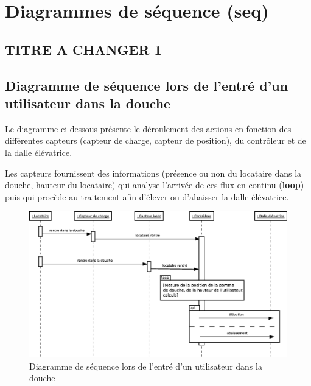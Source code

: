 \chapter{Diagrammes de séquence (seq)}
\section{TITRE A CHANGER 1}

\section{Diagramme de séquence lors de l'entré d'un utilisateur dans la douche}
Le diagramme ci-dessous présente le déroulement des actions en fonction des différentes capteurs (capteur de charge, capteur de position), du contrôleur et de la dalle élévatrice. 

Les capteurs fournissent des informations (présence ou non du locataire dans la douche, hauteur du locataire) qui analyse l'arrivée de ces flux en continu (\textbf{loop}) puis qui procède au traitement afin d'élever ou d'abaisser la dalle élévatrice. 
\begin{figure}[H]
	\centering
	\includegraphics[width=1\linewidth]{diagrams/bathroom/diagramme_sequence2.eps}
	\caption{Diagramme de séquence lors de l'entré d'un utilisateur dans la douche}
	\label{fig:diagramme_seq2}
\end{figure}
